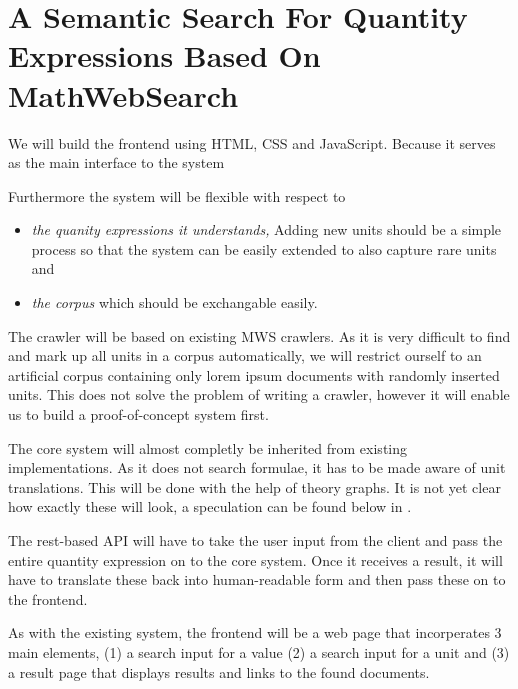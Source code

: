 \documentclass[11pt]{article}
\begin{document}
\section{A Semantic Search For Quantity Expressions Based On MathWebSearch}
\label{sec:system}



We will build the frontend using HTML, CSS and JavaScript. Because it serves as the main interface to the system

Furthermore the system will be flexible with respect to
\begin{itemize}
  \item \textit{the quanity expressions it understands, } Adding new units should be a simple process so that the system can be easily extended to also capture rare units and
  \item \textit{the corpus} which should be exchangable easily.
\end{itemize}

The crawler will be based on existing MWS crawlers. As it is very difficult to find and mark up all units in a corpus automatically, we will restrict ourself to an artificial corpus containing only lorem ipsum documents with randomly inserted units. This does not solve the problem of writing a crawler, however it will enable us to build a proof-of-concept system first.

The core system will almost completly be inherited from existing implementations. As it does not search formulae, it has to be made aware of unit translations. This will be done with the help of theory graphs. It is not yet clear how exactly these will look, a speculation can be found below in .

The rest-based API will have to take the user input from the client and pass the entire quantity expression on to the core system. Once it receives a result, it will have to translate these back into human-readable form and then pass these on to the frontend.

As with the existing system, the frontend will be a web page that incorperates 3 main elements, (1) a search input for a value (2) a search input for a unit and (3) a result page that displays results and links to the found documents.

\end{document}
